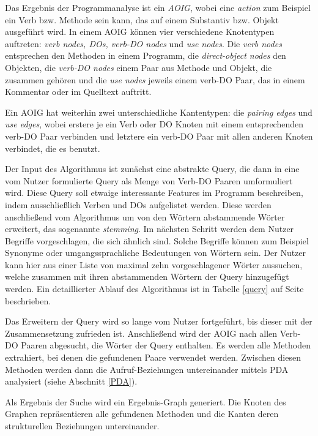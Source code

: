 \documentclass[runningheads,a4paper]{llncs}
\begin{document}
Das Ergebnis der Programmanalyse ist ein \textit{\ac{AOIG}}, wobei eine \textit{action} zum Beispiel ein Verb bzw. Methode sein kann, das auf einem Substantiv bzw. Objekt ausgeführt wird. In einem \ac{AOIG} können vier verschiedene Knotentypen auftreten: \textit{verb nodes, \acp{DO}, verb-DO nodes} und \textit{use nodes}. Die \textit{verb nodes} entsprechen den Methoden in einem Programm, die \textit{direct-object nodes} den Objekten, die \textit{verb-DO nodes} einem Paar aus Methode und Objekt, die zusammen gehören und die \textit{use nodes} jeweils einem verb-DO Paar, das in einem Kommentar oder im Quelltext auftritt.

Ein \ac{AOIG} hat weiterhin zwei unterschiedliche Kantentypen: die \textit{pairing edges} und \textit{use edges}, wobei erstere je ein Verb oder \ac{DO} Knoten mit einem entsprechenden verb-DO Paar verbinden und letztere ein verb-DO Paar mit allen anderen Knoten verbindet, die es benutzt.

Der Input des Algorithmus ist zunächst eine abstrakte Query, die dann in eine vom Nutzer formulierte Query als Menge von Verb-DO Paaren umformuliert wird. Diese Query soll etwaige interessante Features im Programm beschreiben, indem ausschließlich Verben und \acp{DO} aufgelistet werden. Diese werden anschließend vom Algorithmus um von den Wörtern abstammende Wörter erweitert, das sogenannte \textit{stemming}. Im nächsten Schritt werden dem Nutzer Begriffe vorgeschlagen, die sich ähnlich sind. Solche Begriffe können zum Beispiel Synonyme oder umgangssprachliche Bedeutungen von Wörtern sein. Der Nutzer kann hier aus einer Liste von maximal zehn vorgeschlagener Wörter aussuchen, welche zusammen mit ihren abstammenden Wörtern der Query hinzugefügt werden. Ein detaillierter Ablauf des Algorithmus ist in Tabelle \ref{query} auf Seite \pageref{query} beschrieben.

Das Erweitern der Query wird so lange vom Nutzer fortgeführt, bis dieser mit der Zusammensetzung zufrieden ist. Anschließend wird der \ac{AOIG} nach allen Verb-DO Paaren abgesucht, die Wörter der Query enthalten. Es werden alle Methoden extrahiert, bei denen die gefundenen Paare verwendet werden. Zwischen diesen Methoden werden dann die Aufruf-Beziehungen untereinander mittels \ac{PDA} analysiert (siehe Abschnitt \ref{PDA}).

Als Ergebnis der Suche wird ein Ergebnis-Graph generiert. Die Knoten des Graphen repräsentieren alle gefundenen Methoden und die Kanten deren strukturellen Beziehungen untereinander.
\end{document}
